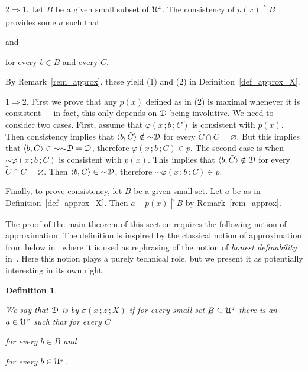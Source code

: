 \documentclass{amsproc}
\makeatletter
\newcounter{thm}
\theoremstyle{mio}
\newtheorem{definition}[thm]{Definition}\tcolorboxenvironment{definition}{mythm}
\providecommand{\proofNameStyle}{\bfseries}
\renewenvironment{proof}[1][\proofname]{\par
  \pushQED{\qed}%
  \normalfont%
  \trivlist
  \item[\hskip\labelsep
        \proofNameStyle
    #1\@addpunct{.}]\ignorespaces
}{%
  \popQED\endtrivlist\@endpefalse
}
\renewcommand*{\emph}[1]{%
   \smash{\tikz[baseline]\node[rectangle, fill=teal!25, rounded corners, inner xsep=0.5ex, inner ysep=0.2ex, anchor=base, minimum height = 2.7ex]{\strut #1};}}
\makeatother
\begin{document}
\begin{proof}
  2$\Rightarrow$1.
  Let $B$ be a given small subset of ${\EuScript U}^z$.
  The consistency of $p(x)\restriction B$ provides some $a$ such that

  \quad and 
  
  \hfill for every $b\in B$ and every $C$. 

  By Remark~\ref{rem_approx}, these yield (1) and (2) in Definition~\ref{def_approx_X}.
  
  1$\Rightarrow$2.
  First we prove that any $p(x)$ defined as in (2) is maximal whenever it is consistent~--~in fact, this only depends on ${\EuScript D}$ being involutive.
  We need to consider two cases.
  First, assume that $\varphi(x\,;b\,;C)$ is consistent with $p(x)$.
  Then consistency implies that $\langle b,\tilde C\rangle\notin{\sim}{\EuScript D}$ for every $\tilde C\cap C=\varnothing$.
  But this implies that $\langle b, C\rangle\in{\sim}{\sim}{\EuScript D}={\EuScript D}$, therefore $\varphi(x\,;b\,;C)\in p$.
  The second case is when ${\sim}\varphi(x\,;b\,;C)$ is consistent with $p(x)$.
  This implies that $\langle b,\tilde C\rangle\notin{\EuScript D}$ for every $\tilde C\cap C=\varnothing$.
  Then $\langle b,C\rangle\in{\sim}{\EuScript D}$, therefore ${\sim}\varphi(x\,;b\,;C)\in p$.

  Finally, to prove consistency, let $B$ be a given small set.
  Let $a$ be as in Definition~\ref{def_approx_X}.
  Then $a\models p(x)\restriction B$ by Remark~\ref{rem_approx}.
\end{proof}

The proof of the main theorem of this section requires the following notion of approximation.
The definition is inspired by the classical notion of approximation from below in~\cite{Z15} where it is used as rephrasing of the notion of \textit{honest definability\/} in~\cite{CS}.
Here this notion plays a purely technical role, but we present it as potentially interesting in its own right.

\begin{definition}\label{def_approx_blw}\strut
  We say that ${\EuScript D}$ is \emph{approximable\/} by $\sigma(x\,;z\,;X)$ \emph{from below\/} if for every small set $B\subseteq{\EuScript U}^z$ there is an $a\in{\EuScript U}^x$ such that for every $C$\smallskip

  \hfill for every $b\in B$ and\smallskip

  \hfill for every $b\in{\EuScript U}^z$.\smallskip
\end{definition}
\end{document}
